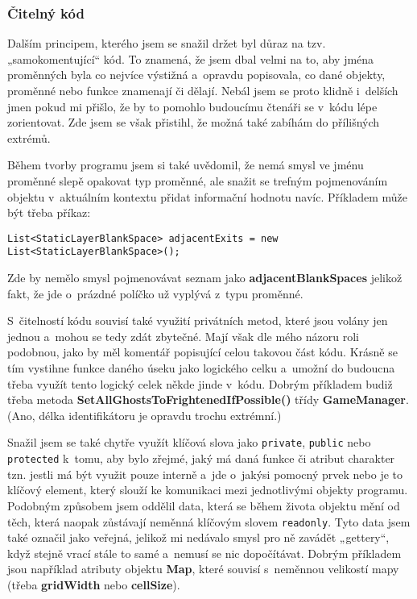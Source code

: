\documentclass{article}
\begin{document}
\subsubsection{Čitelný kód}
Dalším principem, kterého jsem se snažil držet byl důraz na tzv. „samokomentující“ kód. To znamená, že jsem dbal velmi na to, aby jména proměnných byla co nejvíce výstižná a~opravdu popisovala, co dané objekty, proměnné nebo funkce znamenají či dělají. Nebál jsem se proto klidně i~delších jmen pokud mi přišlo, že by to pomohlo budoucímu čtenáři se v~kódu lépe zorientovat. Zde jsem se však přistihl, že možná také zabíhám do přílišných extrémů.

Během tvorby programu jsem si také uvědomil, že nemá smysl ve jménu proměnné slepě opakovat typ proměnné, ale snažit se trefným pojmenováním objektu v~aktuálním kontextu přidat informační hodnotu navíc. Příkladem může být třeba příkaz: 

\verb|List<StaticLayerBlankSpace> adjacentExits = new List<StaticLayerBlankSpace>();|

Zde by nemělo smysl pojmenovávat seznam jako \textbf{adjacentBlankSpaces} jelikož fakt, že jde o~prázdné políčko už vyplývá z~typu proměnné.

S~čitelností kódu souvisí také využití privátních metod, které jsou volány jen jednou a~mohou se tedy zdát zbytečné. Mají však dle mého názoru roli podobnou, jako by měl komentář popisující celou takovou část kódu. Krásně se tím vystihne funkce daného úseku jako logického celku a~umožní do budoucna třeba využít tento logický celek někde jinde v~kódu. Dobrým příkladem budiž třeba metoda \textbf{SetAllGhostsToFrightenedIfPossible()} třídy \textbf{GameManager}. (Ano, délka identifikátoru je opravdu trochu extrémní.)

Snažil jsem se také chytře využít klíčová slova jako \verb|private|, \verb|public| nebo \verb|protected| k~tomu, aby bylo zřejmé, jaký má daná funkce či atribut charakter tzn. jestli má být využit pouze interně a~jde o~jakýsi pomocný prvek nebo je to klíčový element, který slouží ke komunikaci mezi jednotlivými objekty programu. Podobným způsobem jsem oddělil data, která se během života objektu mění od těch, která naopak zůstávají neměnná klíčovým slovem \verb|readonly|. Tyto data jsem také označil jako veřejná, jelikož mi nedávalo smysl pro ně zavádět „gettery“, když stejně vrací stále to samé a~nemusí se nic dopočítávat. Dobrým příkladem jsou například atributy objektu \textbf{Map}, které souvisí s~neměnnou velikostí mapy (třeba \textbf{gridWidth} nebo \textbf{cellSize}).
\end{document}
